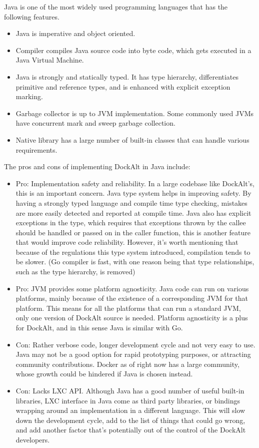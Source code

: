 \documentclass[letterpaper,twocolumn,10pt]{article}
\begin{document}

Java is one of the most widely used programming languages that has the following features.
\begin{itemize}
\item Java is imperative and object oriented. \cite{JavaWikipedia}
\item Compiler compiles Java source code into byte code, which gets executed in a Java Virtual Machine.
\item Java is strongly and statically typed. It has type hierarchy, differentiates primitive and reference types, and is enhanced with explicit exception marking. \cite{JavaType}
\item Garbage collector is up to JVM implementation. Some commonly used JVMs have concurrent mark and sweep garbage collection.
\item Native library has a large number of built-in classes that can handle various requirements.
\end{itemize}
The pros and cons of implementing DockAlt in Java include: 
\begin{itemize}
\item Pro: Implementation safety and reliability. In a large codebase like DockAlt's, this is an important concern. Java type system helps in improving safety. By having a strongly typed language and compile time type checking, mistakes are more easily detected and reported at compile time. Java also has explicit exceptions in the type, which requires that exceptions thrown by the callee should be handled or passed on in the caller function, this is another feature that would improve code reliability. However, it's worth mentioning that because of the regulations this type system introduced, compilation tends to be slower. (Go compiler is fast, with one reason being that type relationships, such as the type hierarchy, is removed)
\item Pro: JVM provides some platform agnosticity. Java code can run on various platforms, mainly because of the existence of a corresponding JVM for that platform. This means for all the platforms that can run a standard JVM, only one version of DockAlt source is needed. Platform agnosticity is a plus for DockAlt, and in this sense Java is similar with Go.
\item Con: Rather verbose code, longer development cycle and not very easy to use. Java may not be a good option for rapid prototyping purposes, or attracting community contributions. Docker as of right now has a large community, whose growth could be hindered if Java is chosen instead.
\item Con: Lacks LXC API. Although Java has a good number of useful built-in libraries, LXC interface in Java come as third party libraries, or bindings wrapping around an implementation in a different language. This will slow down the development cycle, add to the list of things that could go wrong, and add another factor that's potentially out of the control of the DockAlt developers.
\end{itemize}
\end{document}
